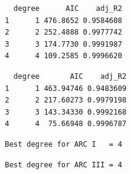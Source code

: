 \documentclass[
  letterpaper,
  DIV=11,
  numbers=noendperiod]{scrartcl}
\newenvironment{Shaded}{\begin{snugshade}}{\end{snugshade}}
\newcommand{\FunctionTok}[1]{\textcolor[rgb]{0.28,0.35,0.67}{#1}}
\newcommand{\NormalTok}[1]{\textcolor[rgb]{0.00,0.23,0.31}{#1}}
\newcommand{\SpecialCharTok}[1]{\textcolor[rgb]{0.37,0.37,0.37}{#1}}
\newcommand{\StringTok}[1]{\textcolor[rgb]{0.13,0.47,0.30}{#1}}
\begin{document}
\begin{verbatim}
  degree      AIC    adj_R2
1      1 476.8652 0.9584608
2      2 252.4888 0.9977742
3      3 174.7730 0.9991987
4      4 109.2585 0.9996620
\end{verbatim}

\begin{Shaded}
\end{Shaded}

\begin{verbatim}
  degree       AIC    adj_R2
1      1 463.94746 0.9483609
2      2 217.60273 0.9979198
3      3 143.34330 0.9992168
4      4  75.66948 0.9996787
\end{verbatim}

\begin{Shaded}
\end{Shaded}

\begin{verbatim}
Best degree for ARC I   = 4 
\end{verbatim}

\begin{Shaded}
\end{Shaded}

\begin{verbatim}
Best degree for ARC III = 4 
\end{verbatim}
\end{document}
